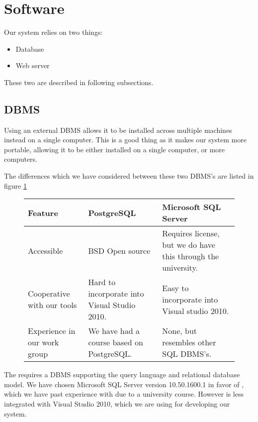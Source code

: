 \section{Software}
\label{sec:software}

Our system relies on two things:

\begin{itemize}
	\item Database
	\item Web server
\end{itemize}

These two are described in following subsections.

\subsection{DBMS}
\label{subsec:dbms}

Using an external DBMS allows it to be installed across multiple machines instead on a single computer. This is a good thing as it makes our system more portable, allowing it to be either installed on a single computer, or more computers.

The differences which we have considered between these two DBMS's are listed in figure \ref{fig:DBMS}\cite{postgres08}

\begin{figure}[htb]
	\centering
		\begin{tabularx}{\textwidth}{L|L|L}
			\textbf{Feature}&\textbf{PostgreSQL}&\textbf{Microsoft SQL Server} \\
			\hline
			Accessible&BSD Open source&Requires license, but we do have this through the university. \\ 
			Cooperative with our tools&Hard to incorporate into Visual Studio 2010. & Easy to incorporate into Visual studio 2010. \\ 
			Experience in our work group&We have had a course based on PostgreSQL. & None, but resembles other SQL DBMS's. \\ 
		\end{tabularx}
	\label{fig:DBMS}
\end{figure}

The \hdesk requires a DBMS supporting the query language \sql[] and relational database model\cite{Sudershan2011}.
We have chosen Microsoft SQL Server version 10.50.1600.1 in favor of \posgresql[], which we have past experience with due to a university course.
However \posgresql[] is less integrated with Visual Studio 2010, which we are using for developing our system.

